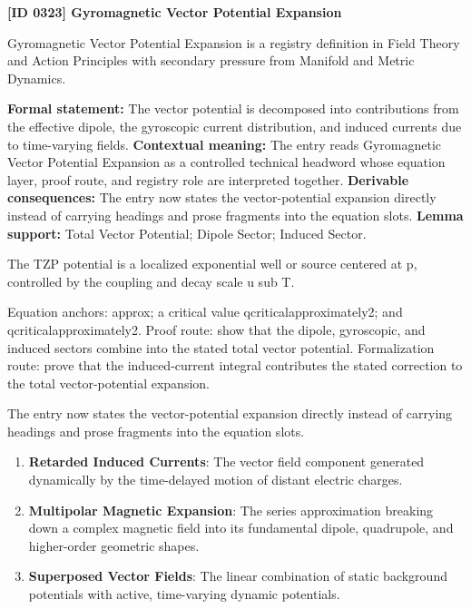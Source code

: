 \clearpage
\noindent\textbf{[ID 0323] Gyromagnetic Vector Potential Expansion}\par
\vspace{0.35em}
\begingroup\small
{}
Gyromagnetic Vector Potential Expansion is a registry definition in Field Theory and Action Principles with secondary pressure from Manifold and Metric Dynamics.

\begingroup\footnotesize\setlength{\emergencystretch}{3em}\sloppy
\textbf{Formal statement:} The vector potential is decomposed into contributions from the effective dipole, the gyroscopic current distribution, and induced currents due to time-varying fields. \textbf{Contextual meaning:} The entry reads Gyromagnetic Vector Potential Expansion as a controlled technical headword whose equation layer, proof route, and registry role are interpreted together. \textbf{Derivable consequences:} The entry now states the vector-potential expansion directly instead of carrying headings and prose fragments into the equation slots. \textbf{Lemma support:} Total Vector Potential; Dipole Sector; Induced Sector.\par
\endgroup

The TZP potential is a localized exponential well or source centered at p, controlled by the coupling and decay scale u sub T.

Equation anchors: approx; a critical value qcriticalapproximately2; and qcriticalapproximately2. Proof route: show that the dipole, gyroscopic, and induced sectors combine into the stated total vector potential. Formalization route: prove that the induced-current integral contributes the stated correction to the total vector-potential expansion.

The entry now states the vector-potential expansion directly instead of carrying headings and prose fragments into the equation slots.
\endgroup

\begin{enumerate}[leftmargin=1.6em,itemsep=6pt,topsep=4pt]
\item \textbf{Retarded Induced Currents}: The vector field component generated dynamically by the time-delayed motion of distant electric charges.
\item \textbf{Multipolar Magnetic Expansion}: The series approximation breaking down a complex magnetic field into its fundamental dipole, quadrupole, and higher-order geometric shapes.
\item \textbf{Superposed Vector Fields}: The linear combination of static background potentials with active, time-varying dynamic potentials.
\end{enumerate}


